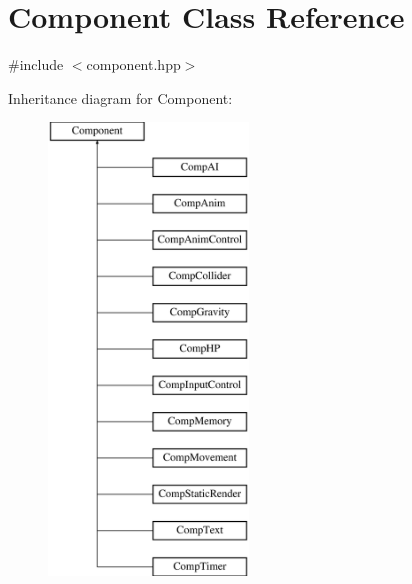 \hypertarget{class_component}{\section{Component Class Reference}
\label{class_component}
}


{\ttfamily \#include $<$component.\-hpp$>$}

Inheritance diagram for Component\-:\begin{figure}[H]
\begin{center}
\leavevmode
\includegraphics[height=12.000000cm]{class_component}
\end{center}
\end{figure}
